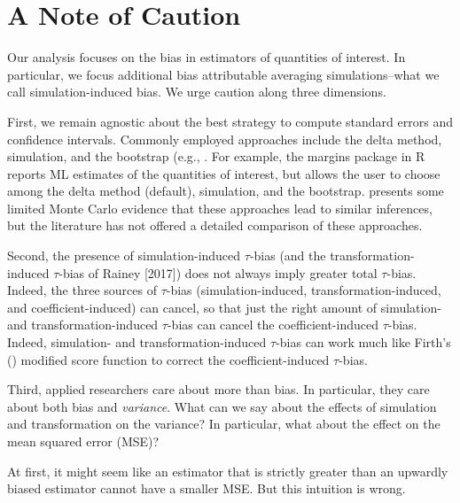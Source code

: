 \documentclass[11pt]{article}
\begin{document}
\section*{A Note of Caution}\label{ci-bias}

Our analysis focuses on the bias in estimators of quantities of interest. In particular, we focus additional bias attributable averaging simulations--what we call simulation-induced bias. We urge caution along three dimensions. 

First, we remain agnostic about the best strategy to compute standard errors and confidence intervals. Commonly employed approaches include the delta method, simulation, and the bootstrap (e.g., \cite{EfronTibshirani1993}. For example, the margins package \citep{margins} in R reports ML estimates of the quantities of interest, but allows the user to choose among the delta method (default), simulation, and the bootstrap.
\cite{KrinskyRobb1991} presents some limited Monte Carlo evidence that these approaches lead to similar inferences, but the literature has not offered a detailed comparison of these approaches.

Second, the presence of simulation-induced $\tau$-bias (and the transformation-induced $\tau$-bias of Rainey [2017]) does not always imply greater total $\tau$-bias. Indeed, the three sources of $\tau$-bias (simulation-induced, transformation-induced, and coefficient-induced) can cancel, so that just the right amount of simulation- and transformation-induced $\tau$-bias can cancel the coefficient-induced $\tau$-bias. Indeed, simulation- and transformation-induced $\tau$-bias can work much like Firth's (\citeyear{Firth1993}) modified score function to correct the coefficient-induced $\tau$-bias.

Third, applied researchers care about more than bias. In particular, they care about both bias and \textit{variance}. What can we say about the effects of simulation and transformation on the variance? In particular, what about the effect on the mean squared error (MSE)?

At first, it might seem like an estimator that is strictly greater than an upwardly biased estimator cannot have a smaller MSE. But this intuition is wrong. 
\end{document}
